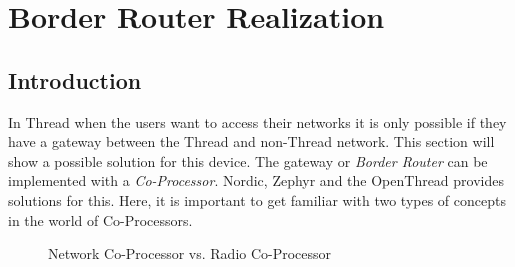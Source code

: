 \section{Border Router Realization}

\subsection{Introduction}
In Thread when the users want to access their networks it is only possible if they have a gateway between the Thread and non-Thread network. This section will show a possible solution for this device. The gateway or \textit{Border Router} can be implemented with a \textit{Co-Processor}. Nordic, Zephyr and the OpenThread provides solutions for this. Here, it is important to get familiar with two types of concepts in the world of Co-Processors.
\begin{figure}[!htb]
    \centering
    \hfill
    \caption{Network Co-Processor vs. Radio Co-Processor}
    \label{fig:ncp}
    \cite{platforms}
\end{figure}

